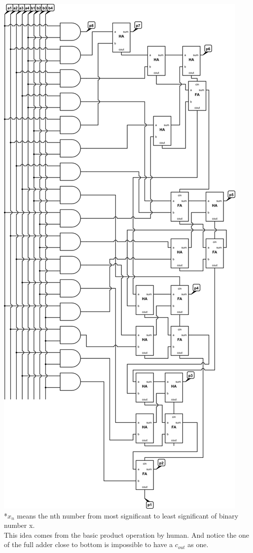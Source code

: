 \documentclass[10pt,twoside,a4paper]{article}
\begin{document}
\includegraphics[scale=1]{sv2-5.png}\\
*$x_n$ means the nth number from most significant to least significant of binary number x.\\
This idea comes from the basic product operation by human.
And notice the one of the full adder close to bottom is impossible to have a $c_{out}$ as one.
\end{document}
